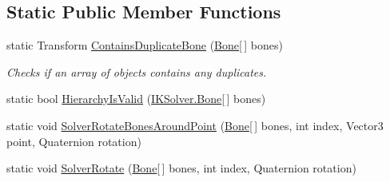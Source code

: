 \subsection*{Static Public Member Functions}
\begin{DoxyCompactItemize}
\item 
static Transform \mbox{\hyperlink{class_root_motion_1_1_final_i_k_1_1_i_k_solver_ad167d79b711bf4f3b1066d379dbbbf38}{Contains\+Duplicate\+Bone}} (\mbox{\hyperlink{class_root_motion_1_1_final_i_k_1_1_i_k_solver_1_1_bone}{Bone}}\mbox{[}$\,$\mbox{]} bones)
\begin{DoxyCompactList}\small\item\em Checks if an array of objects contains any duplicates. \end{DoxyCompactList}\item 
static bool \mbox{\hyperlink{class_root_motion_1_1_final_i_k_1_1_i_k_solver_a44125b5a4b6e873b26fd02256a3ba73e}{Hierarchy\+Is\+Valid}} (\mbox{\hyperlink{class_root_motion_1_1_final_i_k_1_1_i_k_solver_1_1_bone}{I\+K\+Solver.\+Bone}}\mbox{[}$\,$\mbox{]} bones)
\item 
static void \mbox{\hyperlink{class_root_motion_1_1_final_i_k_1_1_i_k_solver_a4a8f110f37d9b956d4bb2aff1232f1aa}{Solver\+Rotate\+Bones\+Around\+Point}} (\mbox{\hyperlink{class_root_motion_1_1_final_i_k_1_1_i_k_solver_1_1_bone}{Bone}}\mbox{[}$\,$\mbox{]} bones, int index, Vector3 point, Quaternion rotation)
\item 
static void \mbox{\hyperlink{class_root_motion_1_1_final_i_k_1_1_i_k_solver_afb1d9bbe43f8423813c731657eccfb3b}{Solver\+Rotate}} (\mbox{\hyperlink{class_root_motion_1_1_final_i_k_1_1_i_k_solver_1_1_bone}{Bone}}\mbox{[}$\,$\mbox{]} bones, int index, Quaternion rotation)
\end{DoxyCompactItemize}
